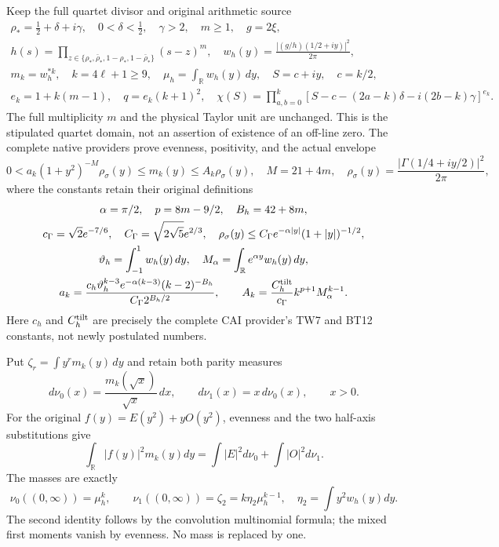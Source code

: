 \documentclass[11pt]{article}
\newcommand{\R}{\mathbb R}
\begin{document}
Keep the full quartet divisor and original arithmetic source
\begin{equation}\label{eq:native}
 \begin{gathered}
 \rho_*=\tfrac12+\delta+i\gamma,\quad0<\delta<\tfrac12,\quad\gamma>2,
 \quad m\ge1,\quad g=2\xi,\\
 h(s)=\prod_{z\in\{\rho_*,\bar\rho_*,1-\rho_*,1-\bar\rho_*\}}(s-z)^m,
 \quad w_h(y)=\frac{|(g/h)(1/2+iy)|^2}{2\pi},\\
 m_k=w_h^{*k},\quad k=4\ell+1\ge9,\quad
 \mu_h=\int_\R w_h(y)\,dy,\quad S=c+iy,\quad c=k/2,\\
 e_k=1+k(m-1),\quad q=e_k(k+1)^2,\quad
 \chi(S)=\prod_{a,b=0}^k
 [S-c-(2a-k)\delta-i(2b-k)\gamma]^{e_k}.
 \end{gathered}
\end{equation}
The full multiplicity $m$ and the physical Taylor unit are unchanged.
This is the stipulated quartet domain, not an assertion of existence of
an off-line zero.  The complete native providers \cite{CAI,HG} prove
evenness, positivity, and the actual envelope
\begin{equation}\label{eq:envelope}
 0<a_k(1+y^2)^{-M}\rho_\sigma(y)\le m_k(y)\le A_k\rho_\sigma(y),
 \quad M=21+4m,\quad
 \rho_\sigma(y)=\frac{|\Gamma(1/4+iy/2)|^2}{2\pi},
\end{equation}
where the constants retain their original definitions
\begin{equation}\label{eq:constants}
 \begin{gathered}
 \alpha=\pi/2,\quad p=8m-9/2,\quad B_h=42+8m,\\
 c_\Gamma=\sqrt2e^{-7/6},\quad
 C_\Gamma=\sqrt{2\sqrt5}e^{2/3},\quad
 \rho_\sigma(y)\le C_\Gamma e^{-\alpha|y|}(1+|y|)^{-1/2},\\
 \vartheta_h=\int_{-1}^1w_h(y)\,dy,\quad
 M_\alpha=\int_\R e^{\alpha y}w_h(y)\,dy,\\
 a_k=\frac{c_h\vartheta_h^{k-3}e^{-\alpha(k-3)}(k-2)^{-B_h}}
 {C_\Gamma2^{B_h/2}},\qquad
 A_k=\frac{C_h^{\rm tilt}}{c_\Gamma}k^{p+1}M_\alpha^{k-1}.
 \end{gathered}
\end{equation}
Here $c_h$ and $C_h^{\rm tilt}$ are precisely the complete CAI
provider's TW7 and BT12 constants, not newly postulated numbers.

Put $\zeta_r=\int y^rm_k(y)\,dy$ and retain both parity measures
\begin{equation}\label{eq:parities}
 d\nu_0(x)=\frac{m_k(\sqrt x)}{\sqrt x}\,dx,\qquad
 d\nu_1(x)=x\,d\nu_0(x),\qquad x>0.
\end{equation}
For the original $f(y)=E(y^2)+yO(y^2)$, evenness and the two
half-axis substitutions give
\begin{equation}\label{eq:paritynorm}
 \int_\R|f(y)|^2m_k(y)dy
 =\int|E|^2d\nu_0+\int|O|^2d\nu_1.
\end{equation}
The masses are exactly
\[
 \nu_0((0,\infty))=\mu_h^k,\qquad
 \nu_1((0,\infty))=\zeta_2=k\eta_2\mu_h^{k-1},
 \quad\eta_2=\int y^2w_h(y)dy.
\]
The second identity follows by the convolution multinomial formula;
the mixed first moments vanish by evenness.  No mass is replaced by one.
\end{document}
